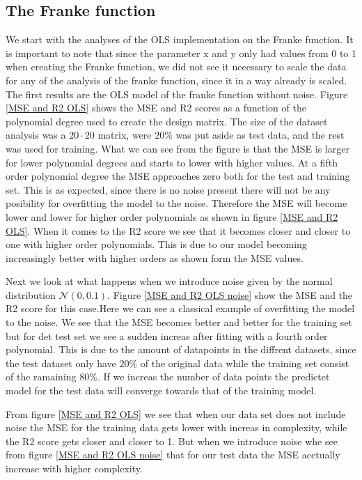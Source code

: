 \subsection*{The Franke function}
\noindent We start with the analyses of the OLS implementation on the Franke
function. It is important to note that since the parameter x and y only had 
values from 0 to 1 when creating the Franke function, we did not see it necessary
to scale the data for any of the analysis of the franke function, since it in a way already is scaled. 
The first results are the OLS model of the franke function without noise. Figure \eqref{MSE and R2 OLS}
shows the MSE and R2 scores as a function of the polynomial degree used to create the design matrix.
The size of the dataset analysis was a $20 \cdot 20$ matrix, were $20\%$ was put aside as 
test data, and the rest was used for training. What we can see from the figure is that
the MSE is larger for lower polynomial degrees and starts to lower with higher values. 
At a fifth order polynomial degree the MSE approaches zero both for the test and training set.
This is as expected, since there is no noise present there will not be any posibility 
for overfitting the model to the noise. Therefore the MSE will become lower and 
lower for higher order polynomials as shown in figure \eqref{MSE and R2 OLS}. When 
it comes to the R2 score we see that it becomes closer and closer to one with higher 
order polynomials. This is due to our model becoming increasingly better with 
higher orders as shown form the MSE values.

Next we look at what happens when we introduce noise given by the normal distribution 
$\mathcal{N}(0,0.1)$. Figure \eqref{MSE and R2 OLS noise} show the MSE and the R2 score
for this case.Here we can see a classical example of overfitting the model to the noise.
We see that the MSE becomes better and better for the training set but for det test set
we see a sudden increas after fitting with a fourth order polynomial. This is due to
the amount of datapoints in the diffrent datasets, since the test dataset only have 
$20\%$ of the original data while the training set consist of the ramaining $80\%$.
If we increas the number of data points the predictet model for the test data will converge
towards that of the training model. 


\noindent From figure \eqref{MSE and R2 OLS} we see that when our data set does not include noise
the MSE for the training data gets lower with increas in complexity, while 
the R2 score gets closer and closer to 1. But when we introduce noise whe see from figure \eqref{MSE and R2 OLS noise}
that for our test data the MSE acctually increase with higher complexity. 

